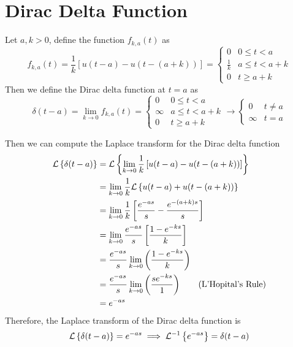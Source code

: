 \documentclass[openany]{report}
\begin{document}
\section{Dirac Delta Function}
\begin{definition}
    Let $a,k > 0$, define the function $f_{k,a}(t)$ as 
    \[f_{k,a}(t) = \frac{1}{k}\left[u(t-a) - u(t-(a+k))\right] = \begin{cases}
        0 & 0 \leq t < a\\
        \frac{1}{k} & a \leq t < a + k\\
        0 & t \geq a + k
    \end{cases}\]
    Then we define the Dirac delta function at $t = a$ as  
    \[\delta(t-a) = \lim_{k\rightarrow 0} f_{k,a}(t) = \begin{cases}
        0 & 0 \leq t < a \\
        \infty  & a \leq t < a + k\\
        0 & t \geq a + k 
    \end{cases} \rightarrow \begin{cases}
        0 & t \neq a\\
        \infty & t = a
    \end{cases}\]
\end{definition}
Then we can compute the Laplace transform for the Dirac delta function 
\begin{align*}
    \mathcal{L}\left\{\delta(t-a)\right\} &= \mathcal{L}\left\{\lim_{k\rightarrow 0} \frac{1}{k}\left[u(t-a) - u(t-(a+k))\right] \right\}\\
    &= \lim_{k\rightarrow 0} \frac{1}{k} \mathcal{L}\left\{u(t-a) + u(t-(a+k))\right\}\\
    &= \lim_{k\rightarrow 0} \frac{1}{k} \left[\frac{e^{-as}}{s} - \frac{e^{-(a+k)s}}{s}\right]\\
    &= \lim_{k\rightarrow 0}\frac{e^{-as}}{s}\left[\frac{1-e^{-ks}}{k}\right]\\
    &= \frac{e^{-as}}{s}\lim_{k\rightarrow 0}\left(\frac{1-e^{-ks}}{k}\right)\\
    &= \frac{e^{-as}}{s}\lim_{k\rightarrow 0}\left(\frac{se^{-ks}}{1}\right)\tag{L'Hopital's Rule}\\
    &= e^{-as}
\end{align*}
Therefore, the Laplace transform of the Dirac delta function is
\[\mathcal{L}\left\{\delta(t-a)\right\} = e^{-as} \implies \mathcal{L}^{-1}\left\{e^{-as}\right\} = \delta(t-a)\]
\end{document}

